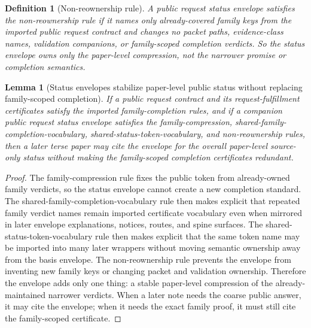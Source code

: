 \documentclass[11pt]{article}
\newtheorem{definition}{Definition}
\newtheorem{lemma}{Lemma}
\begin{document}
\begin{definition}[Non-reownership rule]
A public request status envelope satisfies the \emph{non-reownership rule} if it names only already-covered family keys from the imported public request contract and changes no packet paths, evidence-class names, validation companions, or family-scoped completion verdicts.
So the status envelope owns only the paper-level compression, not the narrower promise or completion semantics.
\end{definition}

\begin{lemma}[Status envelopes stabilize paper-level public status without replacing family-scoped completion]
If a public request contract and its request-fulfillment certificates satisfy the imported family-completion rules, and if a companion public request status envelope satisfies the family-compression, shared-family-completion-vocabulary, shared-status-token-vocabulary, and non-reownership rules, then a later terse paper may cite the envelope for the overall paper-level source-only status without making the family-scoped completion certificates redundant.
\end{lemma}

\begin{proof}
The family-compression rule fixes the public token from already-owned family verdicts, so the status envelope cannot create a new completion standard.
The shared-family-completion-vocabulary rule then makes explicit that repeated family verdict names remain imported certificate vocabulary even when mirrored in later envelope explanations, notices, routes, and spine surfaces.
The shared-status-token-vocabulary rule then makes explicit that the same token name may be imported into many later wrappers without moving semantic ownership away from the basis envelope.
The non-reownership rule prevents the envelope from inventing new family keys or changing packet and validation ownership.
Therefore the envelope adds only one thing: a stable paper-level compression of the already-maintained narrower verdicts.
When a later note needs the coarse public answer, it may cite the envelope; when it needs the exact family proof, it must still cite the family-scoped certificate.\qedhere
\end{proof}
\end{document}
